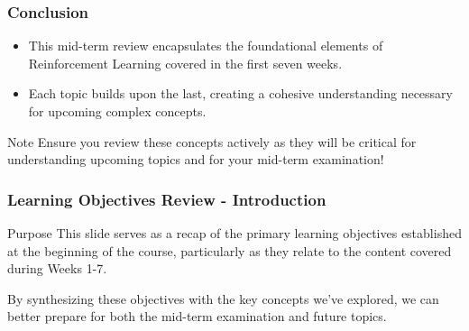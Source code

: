 \documentclass{beamer}
\begin{document}
\begin{frame}[fragile]
    \frametitle{Conclusion}
    \begin{itemize}
        \item This mid-term review encapsulates the foundational elements of Reinforcement Learning covered in the first seven weeks.
        \item Each topic builds upon the last, creating a cohesive understanding necessary for upcoming complex concepts.
    \end{itemize}
    \begin{block}{Note}
        Ensure you review these concepts actively as they will be critical for understanding upcoming topics and for your mid-term examination!
    \end{block}
\end{frame}

\begin{frame}[fragile]
    \frametitle{Learning Objectives Review - Introduction}
    \begin{block}{Purpose}
        This slide serves as a recap of the primary learning objectives established at the beginning of the course, particularly as they relate to the content covered during Weeks 1-7. 
    \end{block}
    By synthesizing these objectives with the key concepts we've explored, we can better prepare for both the mid-term examination and future topics.
\end{frame}
\end{document}
